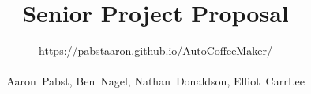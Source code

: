 \documentclass[conference]{IEEEtran}
\begin{document}
\title{Senior Project Proposal}

\author{\url{https://pabstaaron.github.io/AutoCoffeeMaker/} \\ \\ Aaron~Pabst, Ben~Nagel, Nathan~Donaldson, Elliot~CarrLee}




% 
\end{document}
